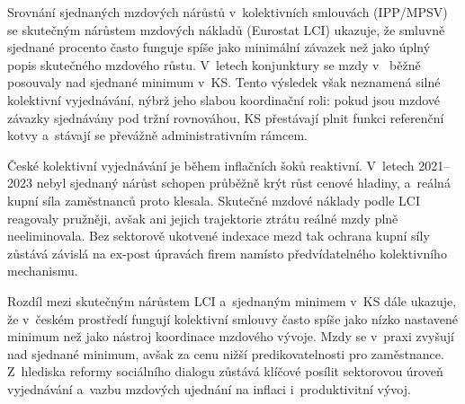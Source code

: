 Srovnání sjednaných mzdových nárůstů v~kolektivních smlouvách (\ac{IPP}/\ac{MPSV}) se skutečným nárůstem mzdových nákladů (Eurostat \ac{LCI}) ukazuje, že smluvně sjednané procento často funguje spíše jako minimální závazek než jako úplný popis skutečného mzdového růstu. V~letech konjunktury se mzdy v~ běžně posouvaly nad sjednané minimum v~\ac{KS}. Tento výsledek však neznamená silné kolektivní vyjednávání, nýbrž jeho slabou koordinační roli: pokud jsou mzdové závazky sjednávány pod tržní rovnováhou, \ac{KS} přestávají plnit funkci referenční kotvy a~stávají se převážně administrativním rámcem.
\par
České kolektivní vyjednávání je během inflačních šoků reaktivní. V~letech 2021--2023 nebyl sjednaný nárůst schopen průběžně krýt růst cenové hladiny, a~reálná kupní síla zaměstnanců proto klesala. Skutečné mzdové náklady podle \ac{LCI} reagovaly pružněji, avšak ani jejich trajektorie ztrátu reálné mzdy plně neeliminovala. Bez sektorově ukotvené indexace mezd tak ochrana kupní síly zůstává závislá na ex-post úpravách firem namísto předvídatelného kolektivního mechanismu.
\par
Rozdíl mezi skutečným nárůstem \ac{LCI} a~sjednaným minimem v~\ac{KS} dále ukazuje, že v~českém prostředí fungují kolektivní smlouvy často spíše jako nízko nastavené minimum než jako nástroj koordinace mzdového vývoje. Mzdy se v~praxi zvyšují nad sjednané minimum, avšak za cenu nižší predikovatelnosti pro zaměstnance. Z~hlediska reformy sociálního dialogu zůstává klíčové posílit sektorovou úroveň vyjednávání a~vazbu mzdových ujednání na inflaci i~produktivitní vývoj.


